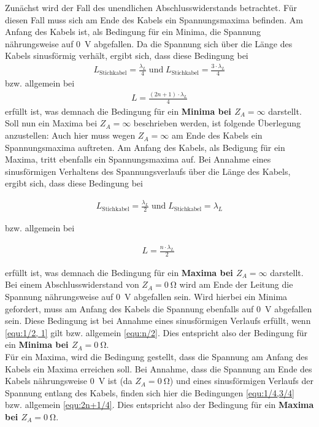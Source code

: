 \documentclass[a4paper,twoside,final]{article}
\begin{document}
Zunächst wird der Fall des unendlichen Abschlusswiderstands betrachtet. Für diesen Fall muss sich am Ende des Kabels ein Spannungsmaxima befinden. Am Anfang des Kabels ist, als Bedingung für ein Minima, die Spannung nährungsweise auf \SI{0}{\volt} abgefallen. Da die Spannung sich über die Länge des Kabels sinusförmig verhält, ergibt sich, dass diese Bedingung bei
\begin{align}\label{equ:1/4,3/4}
  L_{\text{Stichkabel}} = \frac{\lambda_{L}}{4} \; \text{und} \; L_{\text{Stichkabel}} = \frac{3\cdot \lambda_{L}}{4}
\end{align}
bzw. allgemein bei
\begin{align}\label{equ:2n+1/4}
L = \frac{(2n+1)\cdot \lambda_{L}}{4}
\end{align}
erfüllt ist, was demnach die Bedingung für ein \textbf{Minima bei $Z_A = \infty$} darstellt. \\
Soll nun ein Maxima bei $Z_A = \infty$ beschrieben werden, ist folgende Überlegung anzustellen: Auch hier muss wegen $Z_A=\infty$ am Ende des Kabels ein Spannungsmaxima auftreten. Am Anfang des Kabels, als Bedigung für ein Maxima, tritt ebenfalls ein Spannungsmaxima auf. Bei Annahme eines sinusförmigen Verhaltens des Spannungsverlaufs über die Länge des Kabels, ergibt sich, dass diese Bedingung bei

\begin{align}\label{equ:1/2, 1}
L_{\text{Stichkabel}} = \frac{\lambda_{L}}{2} \; \text{und} \; L_{\text{Stichkabel}} = \lambda_{L}
\end{align}

bzw. allgemein bei

\begin{align}\label{equ:n/2}
L = \frac{n \cdot \lambda_{L}}{2} \;
\end{align}

erfüllt ist, was demnach die Bedingung für ein \textbf{Maxima bei $Z_A = \infty$} darstellt. \\

Bei einem Abschlusswiderstand von $Z_A = \SI{0}{\ohm}$ wird am Ende der Leitung die Spannung nährungsweise auf \SI{0}{\volt} abgefallen sein. Wird hierbei ein Minima gefordert, muss am Anfang des Kabels die Spannung ebenfalls auf \SI{0}{\volt} abgefallen sein. Diese Bedingung ist bei Annahme eines sinusförmigen Verlaufs erfüllt, wenn \ref{equ:1/2, 1} gilt bzw. allgemein \ref{equ:n/2}. Dies entspricht also der Bedingung für ein \textbf{Minima bei $Z_A = \SI{0}{\ohm}$}.\\
Für ein Maxima, wird die Bedingung gestellt, dass die Spannung am Anfang des Kabels ein Maxima erreichen soll. Bei Annahme, dass die Spannung am Ende des Kabels nährungsweise \SI{0}{\volt} ist (da $Z_A = \SI{0}{\ohm}$) und eines sinusförmigen Verlaufs der Spannung entlang des Kabels, finden sich hier die Bedingungen \ref{equ:1/4,3/4} bzw. allgemein \ref{equ:2n+1/4}.
Dies entspricht also der Bedingung für ein \textbf{Maxima bei $Z_A = \SI{0}{\ohm}$}.
\end{document}
